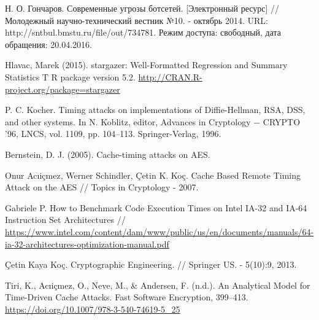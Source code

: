 \begingroup
\renewcommand{\section}[2]{\anonsection{Библиографический список}}
\begin{thebibliography}{00}

    Н. О. Гончаров.
    Современные угрозы ботсетей. [Электронный ресурс] // Молодежный научно-технический вестник №10. - октябрь 2014.
    URL: http://sntbul.bmstu.ru/file/out/734781.
    Режим доступа: свободный, дата обращения: 20.04.2016.

  Hlavac, Marek (2015). stargazer: Well-Formatted Regression and Summary Statistics T
  R package version 5.2. \url{http://CRAN.R-project.org/package=stargazer}

  P. C. Kocher. Timing attacks on implementations of Diffie-Hellman, RSA,
  DSS, and other systems. In N. Koblitz, editor, Advances in Cryptology −
  CRYPTO ’96, LNCS, vol. 1109, pp. 104–113. Springer-Verlag, 1996.

  Bernstein, D. J. (2005). Cache-timing attacks on AES.

  Onur Acıiçmez, Werner Schindler, Çetin K. Koç.
  Cache Based Remote Timing Attack on the AES //
  Topics in Cryptology - 2007.

  Gabriele P. How to Benchmark Code Execution Times on Intel IA-32 and IA-64 Instruction Set Architectures //
  \url{https://www.intel.com/content/dam/www/public/us/en/documents/manuals/64-ia-32-architectures-optimization-manual.pdf}

  Çetin Kaya Koç.
  Cryptographic Engineering. //
  Springer US. - 5(10):9, 2013.

  Tiri, K., Acıiçmez, O., Neve, M., \& Andersen, F. (n.d.).
  An Analytical Model for Time-Driven Cache Attacks.
  Fast Software Encryption, 399–413. \url{https://doi.org/10.1007/978-3-540-74619-5_25}



\end{thebibliography}
\endgroup

\clearpage
